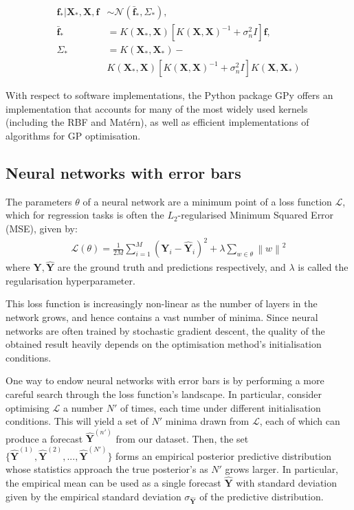 \documentclass[pdftex,10pt,a4paper,journal]{article}
\theoremstyle{definition}
\theoremstyle{remark}
\newcommand*{\V}[1]{\mathbf{#1}}%
\newcommand{\norm}[1]{\left\lVert#1\right\rVert}
\newcommand*\mean[1]{\bar{#1}}
\begin{document}
\begin{multicols}{2}
\begin{align*}
    \V{f}_*|\V{X}_*, \V{X}, \V{f} &\sim \mathcal{N}(\V{\mean{f}}_*, \Sigma_{*}),\\
    \V{\mean{f}}_* &= K(\V{X}_*, \V{X})[K(\V{X},\V{X})^{-1} + \sigma_n^2I]\V{f},\\
    \Sigma_* &= K(\V{X}_*, \V{X}_*) - \\&K(\V{X}_*, \V{X})[K(\V{X}, \V{X})^{-1} + \sigma_n^2I]K(\V{X}, \V{X}_*)
\end{align*}

With respect to software implementations, the Python package GPy \cite{gpy2014} offers an implementation that accounts for many of the most widely used kernels (including the RBF and Mat\'ern), as well as efficient implementations of algorithms for GP optimisation.

\subsection{Neural networks with error bars} \label{sub_nnerror}
The parameters $\theta$ of a neural network are a minimum point of a loss function $\mathcal{L}$, which for regression tasks is often the $L_2$-regularised Minimum Squared Error (MSE), given by:
\begin{align*}
    \mathcal{L}(\theta) = \frac{1}{2M}\sum_{i=1}^M(\V{Y}_i - \V{\hat{Y}}_i)^2 + \lambda\sum_{w \in \theta}\norm{w}^2
\end{align*}
where $\V{Y}, \V{\hat{Y}}$ are the ground truth and predictions respectively, and $\lambda$ is called the regularisation hyperparameter.
\par This loss function is increasingly non-linear as the number of layers in the network grows, and hence contains a vast number of minima. Since neural networks are often trained by stochastic gradient descent, the quality of the obtained result heavily depends on the optimisation method's initialisation conditions.
\par One way to endow neural networks with error bars is by performing a more careful search through the loss function's landscape. In particular, consider optimising $\mathcal{L}$ a number $N'$ of times, each time under different initialisation conditions. This will yield a set of $N'$ minima drawn from $\mathcal{L}$, each of which can produce a forecast $\V{\hat{Y}}^{(n')}$ from our dataset. Then, the set $\{\V{\hat{Y}}^{(1)}, \V{\hat{Y}}^{(2)}, ..., \V{\hat{Y}}^{(N')}\}$ forms an empirical posterior predictive distribution whose statistics approach the true posterior's as $N'$ grows larger. In particular, the empirical mean can be used as a single forecast $\V{\hat{Y}}$ with standard deviation given by the empirical standard deviation $\sigma_{\V{\hat{Y}}}$ of the predictive distribution.


\end{multicols}
\end{document}
